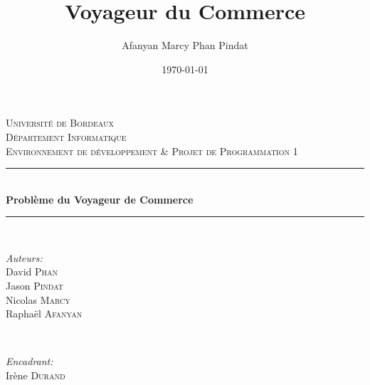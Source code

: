 \documentclass[12pt]{report}
\title{Voyageur du Commerce}
\author{Afanyan Marcy Phan Pindat}
\date{\today}
\begin{document}
\begin{titlepage}

\newcommand{\HRule}{\rule{\linewidth}{0.5mm}} 

\center 
 


\textsc{\LARGE Université de Bordeaux}\\[1.5cm] 
\textsc{\Large Département Informatique}\\[0.5cm] 
\textsc{\large Environnement de développement \& Projet de Programmation 1}\\[0.5cm] 


\HRule \\[0.4cm]
{ \huge \bfseries Problème du Voyageur de Commerce}\\[0.4cm] 
\HRule \\[1.5cm]
 

\begin{minipage}{0.4\textwidth}
\begin{flushleft} \large
\emph{Auteurs:}\\
David \textsc{Phan}\\
Jason \textsc{Pindat}\\
Nicolas \textsc{Marcy}\\
Raphaël \textsc{Afanyan}\\

\end{flushleft}
\end{minipage}
~
\begin{minipage}{0.4\textwidth}
\begin{flushright} \large
\emph{Encadrant:} \\
Irène \textsc{Durand} 
\end{flushright}
\end{minipage}\\[2cm]





\end{titlepage}
\end{document}
